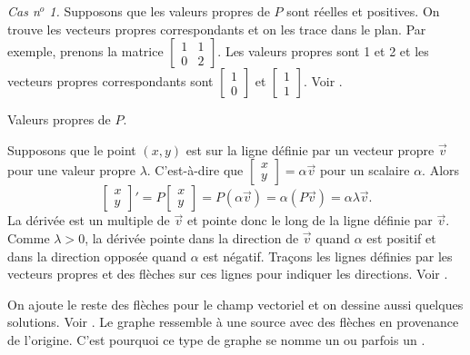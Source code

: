 \emph{Cas n$^o$ 1.}  Supposons que les valeurs propres de $P$ sont réelles et positives. On trouve les vecteurs propres correspondants et on les trace dans le plan. Par exemple, prenons la matrice $\left[ \begin{smallmatrix} 1 & 1 \\ 0 & 2 \end{smallmatrix}
\right]$.
Les valeurs propres sont 1 et 2 et les vecteurs propres correspondants sont
$\left[ \begin{smallmatrix} 1 \\ 0 \end{smallmatrix} \right]$ et
$\left[ \begin{smallmatrix} 1 \\ 1 \end{smallmatrix} \right]$. Voir
.

\begin{mywrapfig}{3.25in}
\capstart
{}
\caption{Valeurs propres de $P$.\label{pln:source-eigfig}}
\end{mywrapfig}

Supposons que le point $(x,y)$ est sur la ligne définie par un vecteur propre
$\vec{v}$ pour une valeur propre $\lambda$.
C’est-à-dire que
$\left[ \begin{smallmatrix} x \\ y \end{smallmatrix} \right] = \alpha \vec{v}$
pour un scalaire $\alpha$.
Alors 
\begin{equation*}
\begin{bmatrix} x \\ y \end{bmatrix} '
=
P \begin{bmatrix} x \\ y \end{bmatrix}
=
P ( \alpha \vec{v} ) =  \alpha ( P \vec{v} )
= \alpha \lambda \vec{v} .
\end{equation*}
La dérivée est un multiple de $\vec{v}$ et pointe donc le long de la ligne définie par $\vec{v}$.  Comme $\lambda > 0$, la dérivée pointe dans la direction de $\vec{v}$ quand $\alpha$ est positif et dans la direction opposée quand $\alpha$ est négatif. Traçons les lignes définies par les vecteurs propres et des flèches sur ces lignes pour indiquer les directions.
Voir .

On ajoute le reste des flèches pour le champ vectoriel et on dessine aussi quelques solutions. Voir
.
Le graphe ressemble à une source avec des flèches en provenance de l’origine. C’est pourquoi ce type de graphe se nomme un \emph{} ou parfois un \emph{}.

